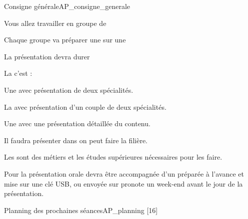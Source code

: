 \teteSndAP


\begin{doc}{Consigne générale}{AP_consigne_generale}
  \begin{listePoints}
    \item Vous allez travailler en groupe de 
    \item Chaque groupe va préparer une  sur une 
    \item La présentation devra durer 
    \item La  c'est :
    \begin{listePoints}
      \item Une  avec présentation de deux spécialités.
      \item La  avec présentation d'un couple de deux spécialités.
      \item Une  avec une présentation détaillée du contenu.
    \end{listePoints}
    \item Il faudra présenter dans  on peut faire la filière.
    \item Les  sont des métiers et les études supérieures nécessaires pour les faire.
  \end{listePoints}

  Pour la présentation orale devra être accompagnée d'un  préparée à l'avance et mise sur une clé USB, ou envoyée sur pronote un week-end avant le jour de la présentation.
\end{doc}

\begin{doc}{Planning des prochaines séances}{AP_planning}
  [16]
  \vspace*{-7.75 cm}
  
  \begin{programmeSeance}[2]
  \end{programmeSeance}
  \vspace*{1.2 cm}
  \begin{programmeSeance}[2]
  \end{programmeSeance}
\end{doc}

